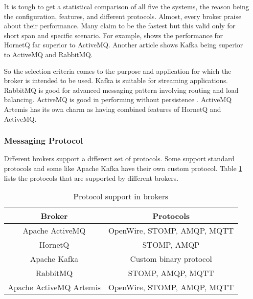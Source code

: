 It is tough to get a statistical comparison of all five the systems, the reason being the configuration, features, and different protocols. Almost, every broker praise about their performance. Many claim to be the fastest but this valid only for short span and specific scenario. For example, \parencite{rabbitmq_perf} shows the performance for HornetQ far superior to ActiveMQ. Another article \parencite{broker_kafka_rabbit_activemq} shows Kafka being superior to ActiveMQ and RabbitMQ.

So the selection criteria comes to the purpose and application for which the broker is intended to be used. Kafka is suitable for streaming applications. RabbitMQ is good for advanced messaging pattern involving routing and load balancing. ActiveMQ is good in performing without persistence \parencite{broker_queue_comp}. ActiveMQ Artemis has its own charm as having combined features of HornetQ and ActiveMQ.

\subsubsection{Messaging Protocol}

Different brokers support a different set of protocols. Some support standard protocols and some like Apache Kafka have their own custom protocol. Table \ref{table:comparison_protocol} lists the protocols that are supported by different brokers.
\begin{table}[h!]
  \centering
  \caption{Protocol support in brokers}
  \label{table:comparison_protocol}
  \begin{tabular}{cc}
    \toprule
    Broker & Protocols \\
    \midrule
    Apache ActiveMQ & OpenWire, STOMP, AMQP, MQTT \\
    HornetQ & STOMP, AMQP \\
    Apache Kafka & Custom binary protocol \\
    RabbitMQ & STOMP, AMQP, MQTT \\
    Apache ActiveMQ Artemis & OpenWire, STOMP, AMQP, MQTT \\
    \bottomrule
  \end{tabular}
\end{table} 
